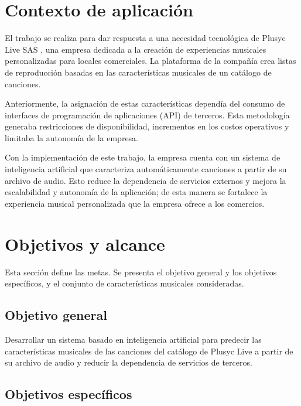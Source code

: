 
\section{Contexto de aplicación}

El trabajo se realiza para dar respuesta a una necesidad tecnológica de Plusyc Live SAS \citep{plusyc_web}, una empresa dedicada a la creación de experiencias musicales personalizadas para locales comerciales. La plataforma de la compañía crea listas de reproducción basadas en las características musicales de un catálogo de canciones. 

Anteriormente, la asignación de estas características dependía del consumo de interfaces de programación de aplicaciones (API) de terceros. Esta metodología generaba restricciones de disponibilidad, incrementos en los costos operativos y limitaba la autonomía de la empresa. 

Con la implementación de este trabajo, la empresa cuenta con un sistema de inteligencia artificial que caracteriza automáticamente canciones a partir de su archivo de audio. Esto reduce la dependencia de servicios externos y mejora la escalabilidad y autonomía de la aplicación; de esta manera se fortalece la experiencia musical personalizada que la empresa ofrece a los comercios.


\section{Objetivos y alcance}

Esta sección define las metas. Se presenta el objetivo general y los objetivos específicos, y el conjunto de características musicales consideradas.

\subsection{Objetivo general}

Desarrollar un sistema basado en inteligencia artificial para predecir las características musicales de las canciones del catálogo de Plusyc Live a partir de su archivo de audio y reducir la dependencia de servicios de terceros.

\subsection{Objetivos específicos}

